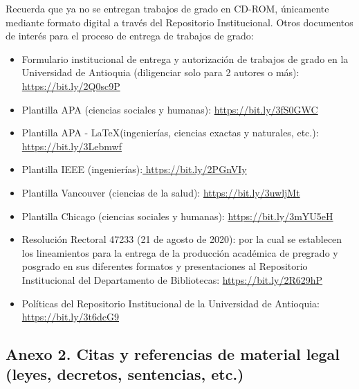 Recuerda que ya no se entregan trabajos de grado en CD-ROM, únicamente mediante formato digital a través del Repositorio Institucional. Otros documentos de interés para el proceso de entrega de trabajos de grado:

\begin{itemize}
    \item  Formulario institucional de entrega y autorización de trabajos de grado en la Universidad de Antioquia (diligenciar solo para 2 autores o más): \url{https://bit.ly/2Q0sc9P}  
    \item  Plantilla APA (ciencias sociales y humanas): \url{https://bit.ly/3fS0GWC} 
     \item Plantilla APA - \LaTeX (ingenierías, ciencias exactas y naturales, etc.): \url{https://bit.ly/3Lebmwf}
    \item  Plantilla IEEE (ingenierías):\url{ https://bit.ly/2PGnVIy}  
    \item  Plantilla Vancouver (ciencias de la salud): \url{https://bit.ly/3uwljMt}  
    \item  Plantilla Chicago (ciencias sociales y humanas): \url{https://bit.ly/3mYU5eH} 
    \item  Resolución Rectoral 47233 (21 de agosto de 2020): por la cual se establecen los lineamientos para la entrega de la producción académica de pregrado y posgrado en sus diferentes formatos y presentaciones al Repositorio Institucional del Departamento de Bibliotecas: \url{https://bit.ly/2R629hP} 
    \item  Políticas del Repositorio Institucional de la Universidad de Antioquia: \url{https://bit.ly/3t6dcG9} 
\end{itemize}


\newpage

\subsection*{Anexo 2. Citas y referencias de material legal (leyes, decretos, sentencias, etc.)}


